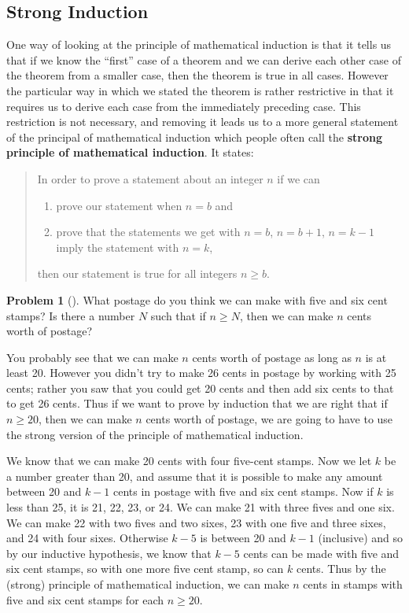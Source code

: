 \documentclass[10pt,]{book}
\newcommand{\terminology}[1]{\textbf{#1}}
\theoremstyle{plain}
\theoremstyle{definition}
\newtheorem{activity}[project]{Problem}
\theoremstyle{definition}
\numberwithin{equation}{chapter}
\begin{document}
\subsection[{Strong Induction}]{Strong Induction}\label{subsection-76}
\hypertarget{p-2018}{}%
One way of looking at the principle of mathematical induction is that it tells us that if we know the ``first'' case of a theorem and we can derive each other case of the theorem from a smaller case, then the theorem is true in all cases. However the particular way in which we stated the theorem is rather restrictive in that it requires us to derive each case from the immediately preceding case. This restriction is not necessary, and removing it leads us to a more general statement of the principal of mathematical induction which people often call the \terminology{strong principle of mathematical induction}. It states:%
\begin{quote}\hypertarget{blockquote-21}{}
\hypertarget{p-2019}{}%
In order to prove a statement about an integer \(n\) if we can \leavevmode%
\begin{enumerate}
\item\hypertarget{li-134}{}\hypertarget{p-2020}{}%
prove our statement when \(n=b\) and%
\item\hypertarget{li-135}{}\hypertarget{p-2021}{}%
prove that the statements we get with \(n=b\), \(n=b+1\), \textellipsis{} \(n=k-1\) imply the statement with \(n=k\),%
\end{enumerate}
 then our statement is true for all integers \(n\ge b\).%
\end{quote}
\begin{activity}[]\marginsymbol[-1em]{} \label{activity-367}
\hypertarget{p-2022}{}%
What postage do you think we can make with five and six cent stamps? Is there a number \(N\) such that if \(n\ge N\), then we can make \(n\) cents worth of postage?%
\end{activity}
\hypertarget{p-2024}{}%
You probably see that we can make \(n\) cents worth of postage as long as \(n\) is at least 20. However you didn't try to make 26 cents in postage by working with 25 cents; rather you saw that you could get 20 cents and then add six cents to that to get 26 cents. Thus if we want to prove by induction that we are right that if \(n\ge 20\), then we can make \(n\) cents worth of postage, we are going to have to use the strong version of the principle of mathematical induction.%
\par
\hypertarget{p-2025}{}%
We know that we can make 20 cents with four five-cent stamps. Now we let \(k\) be a number greater than 20, and assume that it is possible to make any amount between 20 and \(k-1\) cents in postage with five and six cent stamps. Now if \(k\) is less than 25, it is 21, 22, 23, or 24. We can make 21 with three fives and one six. We can make 22 with two fives and two sixes, 23 with one five and three sixes, and 24 with four sixes. Otherwise \(k-5\) is between 20 and \(k-1\) (inclusive) and so by our inductive hypothesis, we know that \(k-5\) cents can be made with five and six cent stamps, so with one more five cent stamp, so can \(k\) cents. Thus by the (strong) principle of mathematical induction, we can make \(n\) cents in stamps with five and six cent stamps for each \(n\ge 20\).%
\end{document}
